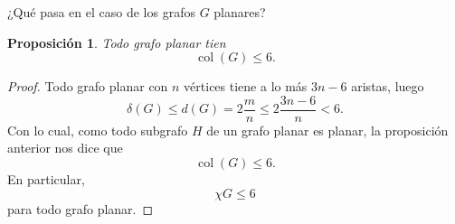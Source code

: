 \documentclass[12pt]{report}
\theoremstyle{plain}
\newtheorem{proposition}[theorem]{Proposición}
\theoremstyle{definition}
\newcommand{\col}[1]{\operatorname{col} (#1)}
\begin{document}
¿Qué pasa en el caso de los grafos $G$ planares?

\begin{proposition}
Todo grafo planar tien
\[
    \col G \leq 6.
\]
\end{proposition}
\begin{proof}
Todo grafo planar con $n$ vértices tiene a lo más $3n - 6$ aristas, luego
\[
    \delta (G) \leq d(G) = 2 \frac{m} n \leq 2 \frac{3 n - 6} n < 6.
\]
Con lo cual, como todo subgrafo $H$ de un grafo planar es planar, la proposición anterior nos dice que
\[
    \col G \leq 6.
\]
En particular,
\[
    \chi G \leq 6
\]
para todo grafo planar.
\end{proof}






























\newpage


{}
\end{document}
